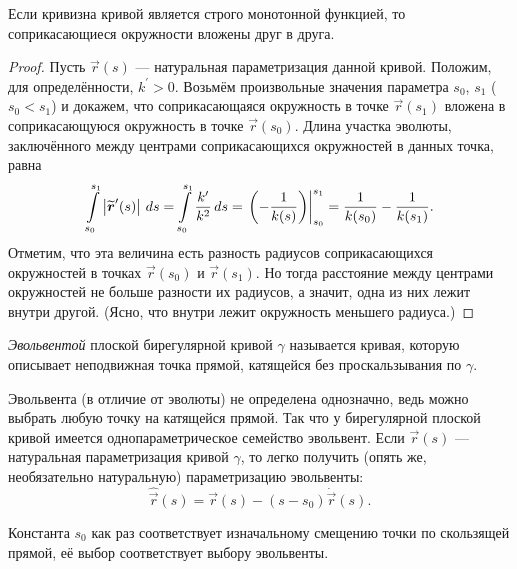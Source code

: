 
\begin{theorem}
	Если кривизна кривой является строго монотонной функцией, то соприкасающиеся окружности вложены друг в друга.
\end{theorem}

\begin{proof}
	Пусть $\vec{r}(s)$ --- натуральная параметризация данной кривой. Положим, для определённости, $k^\prime > 0$. Возьмём произвольные значения параметра $s_0$, $s_1$ ($s_0 < s_1$) и докажем, что соприкасающаяся окружность в точке $\vec{r}(s_1)$ вложена в соприкасающуюся окружность в точке $\vec{r}(s_0)$. Длина участка эволюты, заключённого между центрами соприкасающихся окружностей в данных точка, равна
	\[
		\int\limits_{s_0}^{s_1}\left\lvert\widetilde{\boldsymbol{r}}^\prime(s)\right\rvert\,ds = \int\limits_{s_0}^{s_1}\frac{k^\prime}{k^2}\,ds = \left.\left(-\frac{1}{k(s)}\right)\right|_{s_0}^{s_1} = \frac{1}{k(s_0)} - \frac{1}{k(s_1)}.
	\]
	Отметим, что эта величина есть разность радиусов соприкасающихся окружностей в точках $\vec{r}(s_0)$ и $\vec{r}(s_1)$. Но тогда расстояние между центрами окружностей не больше разности их радиусов, а значит, одна из них лежит внутри другой. (Ясно, что внутри лежит окружность меньшего радиуса.)
\end{proof}

\begin{definition}
	\textit{Эвольвентой} плоской бирегулярной кривой $\gamma$ называется кривая, которую описывает неподвижная точка прямой, катящейся без проскальзывания по $\gamma$.
\end{definition}

Эвольвента (в отличие от эволюты) не определена однозначно, ведь можно выбрать любую точку на катящейся прямой. Так что у бирегулярной плоской кривой имеется однопараметрическое семейство эвольвент. Если $\vec{r}(s)$ --- натуральная параметризация кривой $\gamma$, то легко получить (опять же, необязательно натуральную) параметризацию эвольвенты:
\begin{equation} \label{eq:Involute}
	\widehat{\vec{r}}(s) = \vec{r}(s) - (s - s_0)\dot{\vec{r}}(s).
\end{equation}

Константа $s_0$ как раз соответствует изначальному смещению точки по скользящей прямой, её выбор соответствует выбору эвольвенты.

